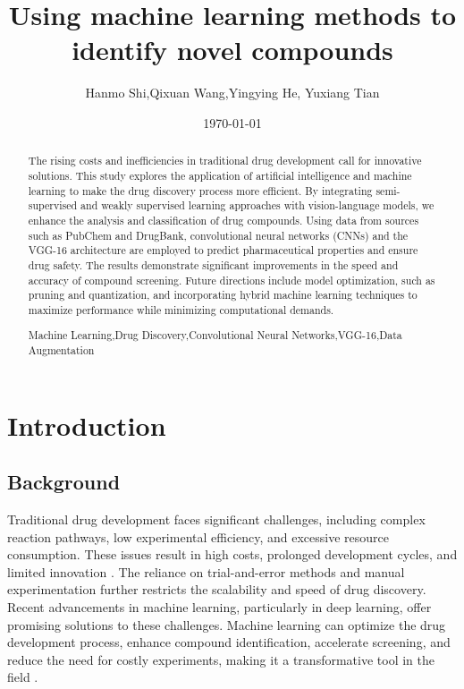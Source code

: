 \documentclass{mcmthesis}
\title{Using machine learning methods to identify novel compounds}
\author{Hanmo Shi,Qixuan Wang,Yingying He, Yuxiang Tian}
\date{\today}
\renewcommand{\contentsname}{\hspace*{\fill}\Large\bfseries Contents \hspace*{\fill}}
\begin{document}
    
\begin{abstract}

    The rising costs and inefficiencies in traditional drug development call for innovative solutions. This study explores the application of artificial intelligence and machine learning to make the drug discovery process more efficient. By integrating semi-supervised and weakly supervised learning approaches with vision-language models, we enhance the analysis and classification of drug compounds. Using data from sources such as PubChem and DrugBank, convolutional neural networks (CNNs) and the VGG-16 architecture are employed to predict pharmaceutical properties and ensure drug safety. The results demonstrate significant improvements in the speed and accuracy of compound screening. Future directions include model optimization, such as pruning and quantization, and incorporating hybrid machine learning techniques to maximize performance while minimizing computational demands.
\begin{keywords}
Machine Learning,Drug Discovery,Convolutional Neural Networks,VGG-16,Data Augmentation
\end{keywords}

\end{abstract}

\maketitle

\tableofcontents        %
\thispagestyle{empty}
\newpage
\section{Introduction}

\subsection{Background}

Traditional drug development faces significant challenges, including complex reaction pathways, low experimental efficiency, and excessive resource consumption. These issues result in high costs, prolonged development cycles, and limited innovation \cite{atanasov2021natural}. The reliance on trial-and-error methods and manual experimentation further restricts the scalability and speed of drug discovery. Recent advancements in machine learning, particularly in deep learning, offer promising solutions to these challenges. Machine learning can optimize the drug development process, enhance compound identification, accelerate screening, and reduce the need for costly experiments, making it a transformative tool in the field \cite{deng2022artificial}.
\end{document}

